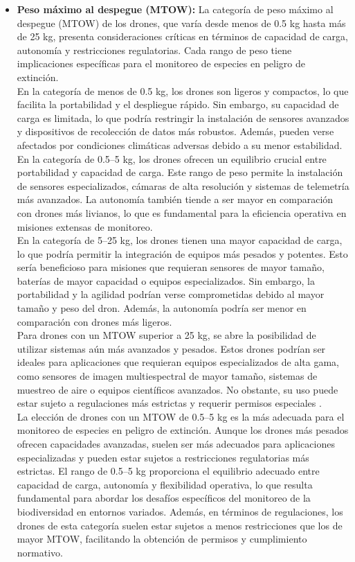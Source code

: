 \begin{itemize}
\item \textbf{Peso máximo al despegue (MTOW):}
La categoría de peso máximo al despegue (MTOW) de los drones, que varía desde menos de 0.5 kg hasta más de 25 kg, presenta consideraciones críticas en términos de capacidad de carga, autonomía y restricciones regulatorias. Cada rango de peso tiene implicaciones específicas para el monitoreo de especies en peligro de extinción.\\
En la categoría de menos de 0.5 kg, los drones son ligeros y compactos, lo que facilita la portabilidad y el despliegue rápido. Sin embargo, su capacidad de carga es limitada, lo que podría restringir la instalación de sensores avanzados y dispositivos de recolección de datos más robustos. Además, pueden verse afectados por condiciones climáticas adversas debido a su menor estabilidad.\\
En la categoría de 0.5–5 kg, los drones ofrecen un equilibrio crucial entre portabilidad y capacidad de carga. Este rango de peso permite la instalación de sensores especializados, cámaras de alta resolución y sistemas de telemetría más avanzados. La autonomía también tiende a ser mayor en comparación con drones más livianos, lo que es fundamental para la eficiencia operativa en misiones extensas de monitoreo.\\
En la categoría de 5–25 kg, los drones tienen una mayor capacidad de carga, lo que podría permitir la integración de equipos más pesados y potentes. Esto sería beneficioso para misiones que requieran sensores de mayor tamaño, baterías de mayor capacidad o equipos especializados. Sin embargo, la portabilidad y la agilidad podrían verse comprometidas debido al mayor tamaño y peso del dron. Además, la autonomía podría ser menor en comparación con drones más ligeros.\\
Para drones con un MTOW superior a 25 kg, se abre la posibilidad de utilizar sistemas aún más avanzados y pesados. Estos drones podrían ser ideales para aplicaciones que requieran equipos especializados de alta gama, como sensores de imagen multiespectral de mayor tamaño, sistemas de muestreo de aire o equipos científicos avanzados. No obstante, su uso puede estar sujeto a regulaciones más estrictas y requerir permisos especiales \cite{tiposdrones}.\\
La elección de drones con un MTOW de 0.5–5 kg es la más adecuada para el monitoreo de especies en peligro de extinción. Aunque los drones más pesados ofrecen capacidades avanzadas, suelen ser más adecuados para aplicaciones especializadas y pueden estar sujetos a restricciones regulatorias más estrictas. El rango de 0.5–5 kg proporciona el equilibrio adecuado entre capacidad de carga, autonomía y flexibilidad operativa, lo que resulta fundamental para abordar los desafíos específicos del monitoreo de la biodiversidad en entornos variados. Además, en términos de regulaciones, los drones de esta categoría suelen estar sujetos a menos restricciones que los de mayor MTOW, facilitando la obtención de permisos y cumplimiento normativo.


\end{itemize}
